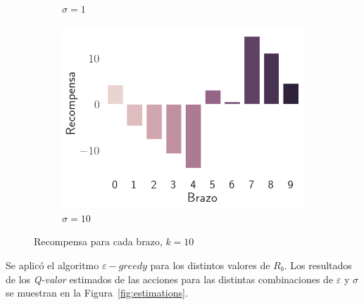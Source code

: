 \documentclass[12pt]{article}
\begin{document}
\begin{figure}[h]
\begin{subfigure}[H]{0.3\textwidth}
            \caption{$\sigma=1$}
            \label{fig:rewards_1}
        \end{subfigure}
        \begin{subfigure}[H]{0.3\textwidth}
            \includegraphics[width=\textwidth]{../img/rewards_sigma_10}
            \caption{$\sigma=10$}
            \label{fig:rewards_10}
        \end{subfigure}
        \caption{Recompensa para cada brazo, $k=10$}
        \label{fig:rewards}
    \end{figure}

    Se aplicó el algoritmo $\varepsilon-greedy$ para los distintos valores de $R_b$.
    Los resultados de los \textit{Q-valor} estimados de las acciones para las distintas combinaciones de $\varepsilon$ y $\sigma$ se muestran en la Figura~\ref{fig:estimations}.
\end{document}
